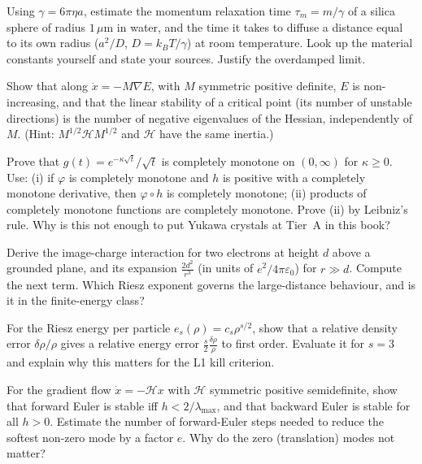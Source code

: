 \begin{exercise}\label{ex:ch4-taum}
Using $\gamma=6\pi\eta a$, estimate the momentum relaxation time $\tau_m=m/\gamma$ of a silica sphere of radius
$1\,\mu$m in water, and the time it takes to diffuse a distance equal to its own radius ($a^2/D$, $D=k_BT/\gamma$)
at room temperature. Look up the material constants yourself and state your sources. Justify the overdamped limit.
\end{exercise}

\begin{exercise}\label{ex:ch4-lyap}
Show that along $\dot x = -M\nabla E$, with $M$ symmetric positive definite, $E$ is non-increasing, and that
the linear stability of a critical point (its number of unstable directions) is the number of negative
eigenvalues of the Hessian, independently of $M$. (Hint: $M^{1/2}\mathcal H M^{1/2}$ and $\mathcal H$ have the same
inertia.)
\end{exercise}

\begin{exercise}\label{ex:ch4-yukawa}
Prove that $g(t)=e^{-\kappa\sqrt t}/\sqrt t$ is completely monotone on $(0,\infty)$ for $\kappa\ge0$. Use: (i) if
$\varphi$ is completely monotone and $h$ is positive with a completely monotone derivative, then
$\varphi\circ h$ is completely monotone; (ii) products of completely monotone functions are completely monotone.
Prove (ii) by Leibniz's rule. Why is this not enough to put Yukawa crystals at Tier~A in this book?
\end{exercise}

\begin{exercise}\label{ex:ch4-image}
Derive the image-charge interaction for two electrons at height $d$ above a grounded plane, and its expansion
$\frac{2d^2}{r^3}$ (in units of $e^2/4\pi\varepsilon_0$) for $r\gg d$. Compute the next term. Which Riesz exponent
governs the large-distance behaviour, and is it in the finite-energy class?
\end{exercise}

\begin{exercise}\label{ex:ch4-density}
For the Riesz energy per particle $e_s(\rho)=c_s\rho^{s/2}$, show that a relative density error $\delta\rho/\rho$
gives a relative energy error $\frac{s}{2}\frac{\delta\rho}{\rho}$ to first order. Evaluate it for $s=3$ and
explain why this matters for the L1 kill criterion.
\end{exercise}

\begin{exercise}\label{ex:ch4-stiff}
For the gradient flow $\dot x=-\mathcal H x$ with $\mathcal H$ symmetric positive semidefinite, show that forward
Euler is stable iff $h<2/\lambda_{\max}$, and that backward Euler is stable for all $h>0$. Estimate the number of
forward-Euler steps needed to reduce the softest non-zero mode by a factor $e$. Why do the zero (translation) modes
not matter?
\end{exercise}

